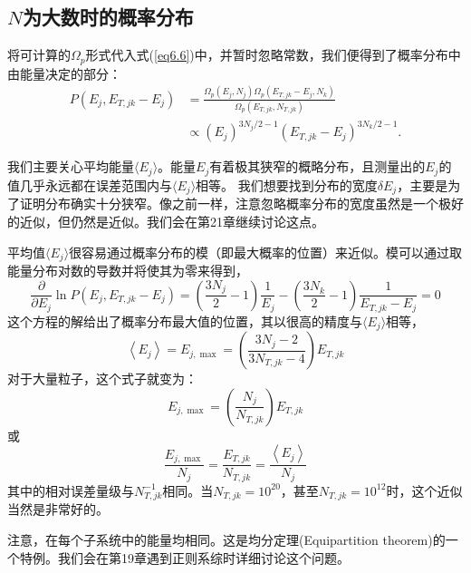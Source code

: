 \documentclass[UTF8]{ctexart}
\numberwithin{equation}{section}%
\numberwithin{figure}{section}%
\begin{document}
    \subsection{\texorpdfstring{$N$为大数时的概率分布}{N为大数时的概率分布}}
    将可计算的$\Omega_p$形式代入式(\ref{eq6.6})中，并暂时忽略常数，我们便得到了概率分布中由能量决定的部分：
    \begin{equation}\label{eq6.22}
        \begin{aligned}
            P\left(E_{j}, E_{T, j k}-E_{j}\right) &=\frac{\Omega_{p}\left(E_{j}, N_{j}\right) \Omega_{p}\left(E_{T, j k}-E_{j}, N_{k}\right)}{\Omega_{p}\left(E_{T, j k}, N_{T, j k}\right)} \\
            & \propto\left(E_{j}\right)^{3 N_{j} / 2-1}\left(E_{T, j k}-E_{j}\right)^{3 N_{k} / 2-1} .
            \end{aligned}
    \end{equation}

    我们主要关心平均能量$\langle{E_j}\rangle$。能量$E_j$有着极其狭窄的概略分布，且测量出的$E_j$的值几乎永远都在误差范围内与$\langle{E_j}\rangle$相等。
    我们想要找到分布的宽度$\delta E_j$，主要是为了证明分布确实十分狭窄。像之前一样，注意忽略概率分布的宽度虽然是一个极好的近似，但仍然是近似。我们会在第21章继续讨论这点。

    平均值$\langle{E_j}\rangle$很容易通过概率分布的模（即最大概率的位置）来近似。模可以通过取能量分布对数的导数并将使其为零来得到，
    \begin{equation}
        \frac{\partial}{\partial E_{j}} \ln P\left(E_{j}, E_{T, j k}-E_{j}\right)=\left(\frac{3 N_{j}}{2}-1\right) \frac{1}{E_{j}}-\left(\frac{3 N_{k}}{2}-1\right) \frac{1}{E_{T, j k}-E_{j}}=0
    \end{equation}
    这个方程的解给出了概率分布最大值的位置，其以很高的精度与$\langle{E_j}\rangle$相等，
    \begin{equation}
        \left\langle E_{j}\right\rangle=E_{j, \max }=\left(\frac{3 N_{j}-2}{3 N_{T, j k}-4}\right) E_{T, j k}
    \end{equation}
    对于大量粒子，这个式子就变为：
    \begin{equation}
        E_{j, \max }=\left(\frac{N_{j}}{N_{T, j k}}\right) E_{T, j k}
    \end{equation}
    或
    \begin{equation}\label{eq6.26}
        \frac{E_{j, \max }}{N_{j}}=\frac{E_{T, j k}}{N_{T, j k}}=\frac{\left\langle E_{j}\right\rangle}{N_{j}}
    \end{equation}
    其中的相对误差量级与$N_{T,jk}^{-1}$相同。当$N_{T,jk}=10^{20}$，甚至$N_{T,jk}=10^{12}$时，这个近似当然是非常好的。
    \begin{mdframed}[backgroundcolor=lightgray,hidealllines=true]
    注意，在每个子系统中的能量均相同。这是均分定理(Equipartition theorem)的一个特例。我们会在第19章遇到正则系综时详细讨论这个问题。
    \end{mdframed}
\end{document}
